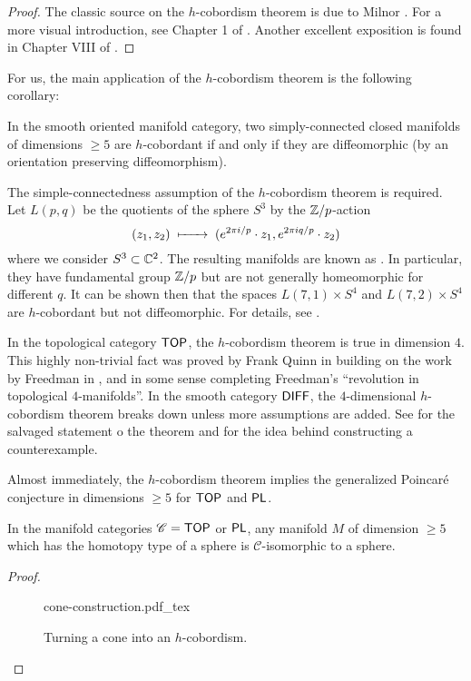 \begin{remark}
\begin{proof}
	The classic source on the $h$-cobordism theorem is due to Milnor \cite{milnor1965hcobordism}. For a more visual introduction, see Chapter 1 of \cite{scorpan2005wild}. Another excellent exposition is found in Chapter VIII of \cite{kosinski1993differential}.
\end{proof}

For us, the main application of the $h$-cobordism theorem is the following corollary:

\begin{corollary}\label{thm:h-cobordism-diffeomorphism}
	In the smooth oriented manifold category, two simply-connected closed manifolds of dimensions $\geq 5$ are $h$-cobordant if and only if they are diffeomorphic (by an orientation preserving diffeomorphism).
\end{corollary}

\begin{remark}
	The simple-connectedness assumption of the $h$-cobordism theorem is required. Let $L(p,q)$ be the quotients of the sphere $S^3$ by the $\mathbb{Z}/p$-action 
	\[
		(z_1,z_2) \lkxmapsto (e^{2\pi i/p}\cdot z_1, e^{2\pi i q/p}\cdot z_2)
	\]
	where we consider $S^3\subset \mathbb{C}^2$. The resulting manifolds are known as .  In particular, they have fundamental group $\mathbb{Z}/p$ but are not generally homeomorphic for different $q$. It can be shown then that the spaces $L(7,1)\times S^4$ and $L(7,2)\times S^4$ are $h$-cobordant but not diffeomorphic. For details, see \cite{counterexamples2022}.
\end{remark}

\begin{remark}
	In the topological category $\mathsf{TOP}$, the $h$-cobordism theorem is true in dimension $4$. This highly non-trivial fact was proved by Frank Quinn in \cite{quinn1982} building on the work by Freedman in \cite{freedman1982manifold}, and in some sense completing Freedman's ``revolution in topological $4$-manifolds''. In the smooth category $\mathsf{DIFF}$, the $4$-dimensional $h$-cobordism theorem breaks down unless more assumptions are added. See \cite{cfhs1996hcobordism} for the salvaged statement o the theorem and \cite{akbulut1991} for the idea behind constructing a counterexample.
\end{remark}

Almost immediately, the $h$-cobordism theorem implies the generalized Poincar\'e conjecture in dimensions $\geq 5$ for $\mathsf{TOP}$ and $\mathsf{PL}$. 

\begin{corollary}\label{thm:generalized-poincare-smale}
	In the manifold categories $\mathscr{C}=\mathsf{TOP}$ or $\mathsf{PL}$, any manifold $M$ of dimension $\geq 5$ which has the homotopy type of a sphere is $\mathscr{C}$-isomorphic to a sphere.	
\end{corollary}
\begin{proof}
	\begin{figure}[ht]
		\centering
		{cone-construction.pdf_tex}
		\caption{Turning a cone into an $h$-cobordism.}
	\end{figure}


\end{proof}
\end{remark}
